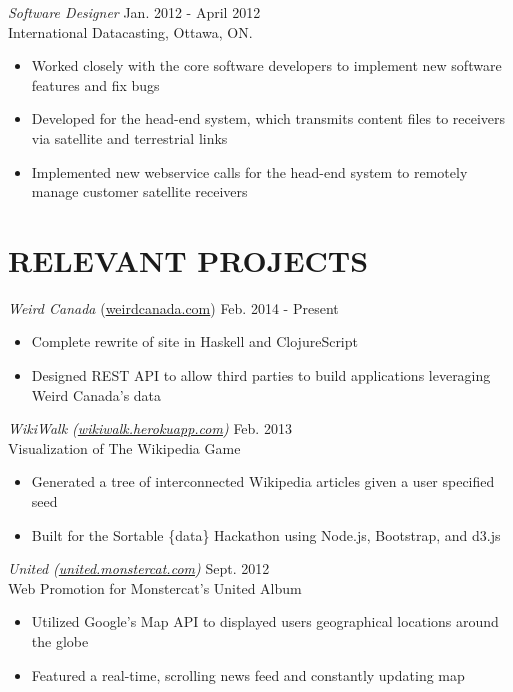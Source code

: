 \documentclass[margin]{res}
\begin{document}
\begin{resume}
{\sl Software Designer} \hfill Jan. 2012 - April 2012 \\
International Datacasting, Ottawa, ON.
\begin{itemize}  \itemsep -2pt %
  \item Worked closely with the core software developers to implement new software features and fix bugs
  \item Developed for the head-end system, which transmits content files to receivers via satellite and terrestrial links
  \item Implemented new webservice calls for the head-end system to remotely manage customer satellite receivers
\end{itemize}

\section{RELEVANT PROJECTS}

{\sl Weird Canada} (\href{http://weirdcanada.com}{weirdcanada.com}) \hfill Feb. 2014 - Present
\begin{itemize} \itemsep -2pt
  \item Complete rewrite of site in Haskell and ClojureScript
  \item Designed REST API to allow third parties to build applications leveraging Weird Canada's data
\end{itemize}

{\sl WikiWalk (\href{http://wikiwalk.herokuapp.com}{wikiwalk.herokuapp.com}) } \hfill Feb. 2013 \\
Visualization of The Wikipedia Game
\begin{itemize} \itemsep -2pt
  \item Generated a tree of interconnected Wikipedia articles given a user specified seed
  \item Built for the Sortable \{data\} Hackathon using Node.js, Bootstrap, and d3.js
\end{itemize}

{\sl United (\href{http://united.monstercat.com}{united.monstercat.com}) } \hfill Sept. 2012 \\
Web Promotion for Monstercat's United Album
\begin{itemize} \itemsep -2pt
  \item Utilized Google's Map API to displayed users geographical locations around the globe
  \item Featured a real-time, scrolling news feed and constantly updating map
\end{itemize}


\end{resume}
\end{document}
